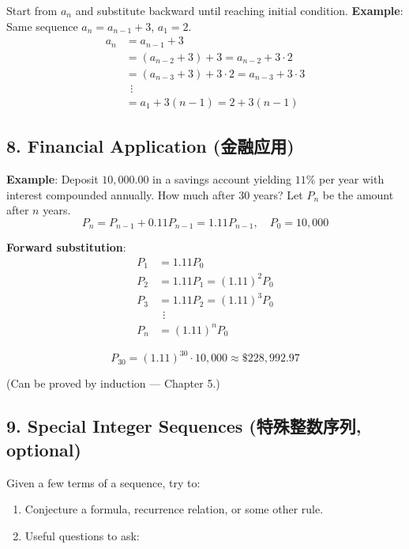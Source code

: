 \documentclass[10pt,a4paper,openany]{ctexbook}
\theoremstyle{definition}
\theoremstyle{remark}
\begin{document}
Start from $a_n$ and substitute backward until reaching initial condition.
\textbf{Example}: Same sequence $a_n = a_{n-1} + 3$, $a_1 = 2$.
\[
\begin{aligned}
a_n &= a_{n-1} + 3 \\
&= (a_{n-2} + 3) + 3 = a_{n-2} + 3 \cdot 2 \\
&= (a_{n-3} + 3) + 3 \cdot 2 = a_{n-3} + 3 \cdot 3 \\
&\ \ \vdots \\
&= a_1 + 3(n-1) = 2 + 3(n-1)
\end{aligned}
\]

\vspace{-2pt}

\subsection{8. Financial Application (金融应用)}

\textbf{Example}: Deposit $10,000.00$ in a savings account yielding $11\%$ per year with interest compounded annually. How much after 30 years?
Let $P_n$ be the amount after $n$ years.
\[
P_n = P_{n-1} + 0.11P_{n-1} = 1.11P_{n-1}, \quad P_0 = 10,000
\]

\textbf{Forward substitution}:
\[
\begin{aligned}
P_1 &= 1.11P_0 \\
P_2 &= 1.11P_1 = (1.11)^2P_0 \\
P_3 &= 1.11P_2 = (1.11)^3P_0 \\
&\ \ \vdots \\
P_n &= (1.11)^n P_0
\end{aligned}
\]

\[
P_{30} = (1.11)^{30} \cdot 10,000 \approx \$228,992.97
\]

(Can be proved by induction — Chapter 5.)
\vspace{-2pt}

\subsection{9. Special Integer Sequences (特殊整数序列, optional)}

Given a few terms of a sequence, try to:
\begin{enumerate}
\item Conjecture a formula, recurrence relation, or some other rule.
\item Useful questions to ask:
\end{enumerate}
\end{document}
